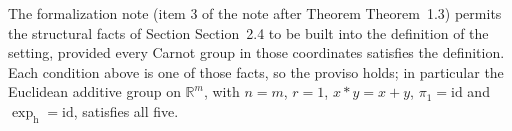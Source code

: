 \begin{definition}
The formalization note (item 3 of the note after Theorem Theorem~1.3) permits the
structural facts of Section Section~2.4 to be built into the definition of the setting,
provided every Carnot group in those coordinates satisfies the definition. Each condition
above is one of those facts, so the proviso holds; in particular the Euclidean additive
group on $\mathbb R^m$, with $n=m$, $r=1$, $x*y=x+y$, $\pi_1=\mathrm{id}$ and
$\exp_{\mathrm h}=\mathrm{id}$, satisfies all five.
\end{definition}
